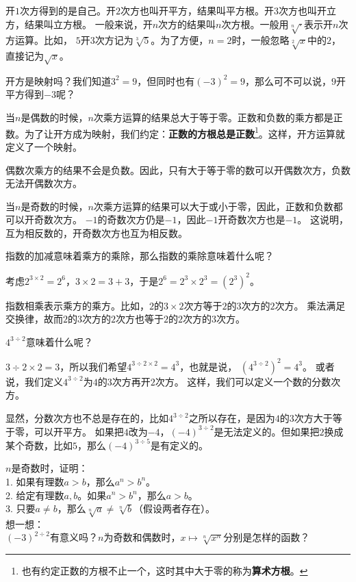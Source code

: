 \documentclass[12pt,UTF8]{ctexbook}
\begin{document}
开$1$次方得到的是自己。开$2$次方也叫开平方，结果叫平方根。开$3$次方也叫开立方，结果叫立方根。
一般来说，开$n$次方的结果叫$n$次方根。一般用$\sqrt[n]{\cdot}$表示开$n$次方运算。比如，
$5$开$3$次方记为$\sqrt[3]{5}$。为了方便，$n=2$时，一般忽略$\sqrt[2]{x}$中的$2$，直接记为$\sqrt{x}$。

开方是映射吗？我们知道$3^2 =9$，但同时也有$(-3)^2 =9$，那么可不可以说，$9$开平方得到$-3$呢？

当$n$是偶数的时候，$n$次乘方运算的结果总大于等于零。正数和负数的乘方都是正数。为了让开方成为映射，我们约定：\textbf{正数的方根总是正数}\footnote{也有约定正数的方根不止一个，这时其中大于零的称为\textbf{算术方根}。}。这样，开方运算就定义了一个映射。

偶数次乘方的结果不会是负数。因此，只有大于等于零的数可以开偶数次方，负数无法开偶数次方。

当$n$是奇数的时候，$n$次乘方运算的结果可以大于或小于零，因此，正数和负数都可以开奇数次方。
$-1$的奇数次方仍是$-1$，因此$-1$开奇数次方也是$-1$。
这说明，互为相反数的，开奇数次方也互为相反数。

指数的加减意味着乘方的乘除，那么指数的乘除意味着什么呢？

考虑$2^{3\times 2} = 2^6$，$3\times 2 = 3 + 3$，于是$2^6 = 2^3 \times 2^3 = \left(2^3\right)^2$。

指数相乘表示乘方的乘方。比如，$2$的$3\times 2$次方等于$2$的$3$次方的$2$次方。
乘法满足交换律，故而$2$的$3$次方的$2$次方也等于$2$的$2$次方的$3$次方。

$4^{3\div 2}$意味着什么呢？

$3\div 2 \times 2 = 3$，所以我们希望$4^{3\div 2 \times 2} = 4^3$，也就是说，
$\left(4^{3\div 2}\right)^2 = 4^3$。
或者说，我们定义$4^{3\div 2}$为$4$的$3$次方再开$2$次方。
这样，我们可以定义一个数的分数次方。

显然，分数次方也不总是存在的，比如$4^{3\div 2}$之所以存在，是因为$4$的$3$次方大于等于零，可以开平方。
如果把$4$改为$-4$，$(-4)^{3\div 2}$是无法定义的。但如果把$2$换成某个奇数，比如$5$，那么$(-4)^{3\div 5}$是有定义的。

\begin{sk}\label{sk:3-0-0}
    $n$是奇数时，证明：\\
    1. 如果有理数$a > b$，那么$a^n > b^n$。\\
    2. 给定有理数$a, b$。如果$a^n > b^n$，那么$a > b$。\\
    3. 只要$a \neq b$，那么$\sqrt[n]{a} \neq \sqrt[n]{b}$（假设两者存在）。\\
    想一想：\\
    $(-3)^{2\div 2}$有意义吗？$n$为奇数和偶数时，$x \mapsto \sqrt[n]{x^n}$分别是怎样的函数？
\end{sk}
\end{document}

